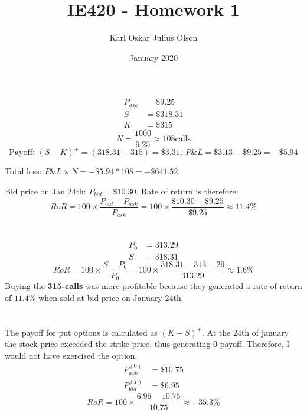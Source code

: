 \documentclass{article}
\title{IE420 - Homework 1}
\author{Karl Oskar Julius Olson}
\date{January 2020}
\begin{document}
\thispagestyle{fancy}

\section{}
\begin{align*}
	P_{ask} &= \$9.25 \\
	S &= \$318.31 \\
	K &= \$315
\end{align*}
$$N = \frac{1000}{9.25} \approx 108  \text{calls}$$
$$\text{Payoff: } (S-K)^+ = (318.31 - 315) = \$3.31, \ P\&L = \$3.13-\$9.25 = -\$5.94$$

Total loss: $P\&L \times N = -\$5.94 * 108 = -\$641.52$

Bid price on Jan 24th: $P_{bid} = \$10.30$. Rate of return is therefore: $$RoR = 100 \times \frac{P_{bid}-P_{ask}}{P_{ask}} = 100 \times \frac{\$10.30-\$9.25}{\$9.25} \approx 11.4\%$$

\section{}

\begin{align*}
	P_0 &= 313.29 \\
	S &= 318.31
\end{align*}
$$RoR = 100 \times \frac{S-P_0}{P_0} = 100 \times \frac{318.31-313-29}{313.29} \approx 1.6\%$$
Buying the \textbf{315-calls} was more profitable because they generated a rate of return of $11.4\%$ when sold at bid price on January 24th. 

\section{}

The payoff for put options is calculated as $(K-S)^+$. At the 24th of january the stock price exceeded the strike price, thus generating 0 payoff. Therefore, I would not have exercised the option.
\begin{align*}
	P_{ask}^{(0)} &= \$10.75 \\
	P_{bid}^{(T)} &= \$6.95
\end{align*}
$$RoR = 100 \times \frac{6.95-10.75}{10.75} \approx -35.3 \%$$

\section{}
\end{document}
